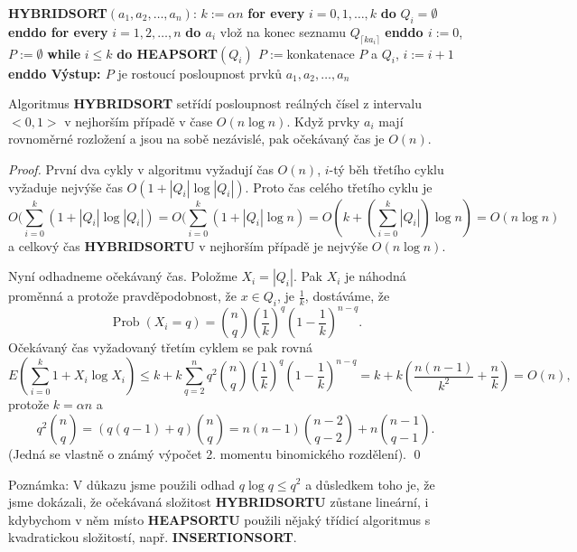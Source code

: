 \documentclass[a4paper,12pt]{article}
\DeclareMathOperator*{\Prob}{Prob}
\begin{document}
{\bf HYBRIDSORT$(a_1,a_2,\dots,a_n)$}:\newline 
$k:=\alpha n$\newline 
{\bf for every} $i=0,1,\dots,k$ {\bf do} $Q_i=\emptyset$ {\bf enddo\newline 
for every} $i=1,2,\dots,n$ {\bf do\newline 
\phantom{{\rm ---}}$a_i$} vlož na konec seznamu $Q_{\lceil ka_
i\rceil}$\newline 
{\bf enddo\newline 
$i:=0$}, $P:=\emptyset$\newline 
{\bf while} $i\le k$ {\bf do\newline 
\phantom{{\rm ---}}HEAPSORT$(Q_i)$
$P:=$}konkatenace $P$ a $Q_i$, $i:=i+1$\newline 
{\bf enddo\newline 
Výstup: $P$} je rostoucí posloupnost prvků 
$a_1,a_2,\dots,a_n$

\begin{veta}Algoritmus {\bf HYBRIDSORT} setřídí 
posloupnost reál\-ných čísel z intervalu $<0,1>$ v 
nejhorším případě v čase $O(n\log n)$. Když prvky $
a_i$ 
mají rovnoměrné rozložení a jsou na sobě nezá\-vislé, 
pak očekávaný čas je $O(n)$.
\end{veta}

\begin{proof}První dva cykly v algoritmu 
vyžadují čas $O(n)$, $i$-tý běh třetího cyklu vyžaduje 
nejvýše čas $O(1+|Q_i|\log|Q_i|)$. Proto čas celého třetího cyklu je 
$$O(\sum_{i=0}^k(1+|Q_i|\log|Q_i|)=O(\sum_{i=0}^k(1+|Q_i|\log n)=
O(k+(\sum_{i=0}^k|Q_i|)\log n)=O(n\log n)$$
a celkový čas {\bf HYBRIDSORTU} v nejhorším případě je nejvýše $
O(n\log n)$.

Nyní odhadneme očekávaný čas. Položme 
$X_i=|Q_i|$. Pak 
$X_i$ je ná\-hodná proměnná a 
protože pravděpodobnost, že $x\in Q_i$, je $\frac 1k$, dostá\-váme, že 
$$\Prob(X_i=q)=\binom nq(\frac 1k)^q(1-\frac 1k)^{n-q}.$$
Očekávaný čas vyžadovaný třetím cyklem se pak rovná 
$$E(\sum_{i=0}^k1+X_i\log X_i)\le k+k\sum_{q=2}^nq^2\binom nq(\frac 
1k)^q(1-\frac 1k)^{n-q}=k+k(\frac {n(n-1)}{k^2}+\frac nk)=O(n),$$
protože $k=\alpha n$ a 
$$q^2\binom nq=(q(q-1)+q)\binom nq=n(n-1)\binom {n-2}{q-2}+n\binom {
n-1}{q-1}.$$
(Jedná se vlastně o známý výpočet 2. momentu 
binomického rozdělení). \qed
\end{proof}

Poznámka: V důkazu jsme použili odhad 
$q\log q\le q^2$ a důsledkem toho je, že jsme 
dokázali, že očekávaná složitost {\bf HYBRIDSORTU }
zůstane lineární, i kdybychom v něm místo 
{\bf HEAPSORTU} použili nějaký třídicí algoritmus s 
kvadratickou složitostí, např. {\bf INSERTIONSORT}.
\end{document}
